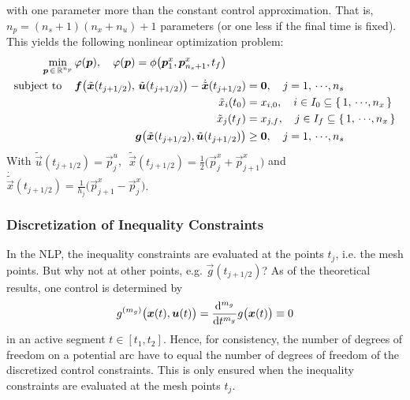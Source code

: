 				with one parameter more than the constant control approximation. That is, \( n_p = (n_s + 1) (n_x + n_u) + 1 \) parameters (or one less if the final time is fixed). This yields the following nonlinear optimization problem:
				\begin{align*}
					\min_{\bm{p} \,\in\, \mathbb{R}^{n_p}} & \, \varphi(\bm{p}),\quad \varphi(\bm{p}) = \phi\big(\bm{p}_1^x, \bm{p}_{n_s + 1}^x, t_f\big) \\
					\mathrm{subject~to}\quad        & \,
					\begin{alignedat}[t]{2}
						\bm{f}\big( \tilde{\bm{x}}(t_{j + 1/2}),\, \tilde{\bm{u}}(t_{j + 1/2}) \big) - \dot{\tilde{\bm{x}}}(t_{j + 1/2}) &= \bm{0},\quad j = 1,\,\cdots\!,n_s \\
						\tilde{x}_i(t_0) &= x_{i, 0},\quad i \in I_0 \subseteq \{\, 1,\,\cdots\!,n_x \,\} \\
						\tilde{x}_j(t_f) &= x_{j, f},\quad j \in I_f \subseteq \{\, 1,\,\cdots\!,n_x \,\} \\
						\bm{g}\big( \tilde{\bm{x}}(t_{j + 1/2}), \tilde{\bm{u}}(t_{j + 1/2}) \big) &\geq \bm{0},\quad j = 1,\,\cdots\!,n_s
					\end{alignedat}
				\end{align*}
				With \( \tilde{\vec{u}}(t_{j + 1/2}) = \vec{p}_j^u \),\,\, \( \tilde{\vec{x}}(t_{j + 1/2}) = \frac{1}{2} \big( \vec{p}_j^x + \vec{p}_{j + 1}^x \big) \) and \( \dot{\tilde{\vec{x}}}(t_{j + 1/2}) = \frac{1}{h_j} \big( \vec{p}_{j + 1}^x - \vec{p}_j^x \big) \).

			\subsubsection{Discretization of Inequality Constraints}
				In the NLP, the inequality constraints are evaluated at the points \( t_j \), i.e. the mesh points. But why not at other points, e.g. \( \vec{g}(t_{j + 1/2}) \)? As of the theoretical results, one control is determined by
				\begin{align*}
					g^{(m_g)}\big(\bm{x}(t), \bm{u}(t)\big) = \dv[m_g]{t} g\big(\bm{x}(t)\big) \equiv 0
				\end{align*}
				in an active segment \( t \in [t_1, t_2] \). Hence, for consistency, the number of degrees of freedom on a potential arc have to equal the number of degrees of freedom of the discretized control constraints. This is only ensured when the inequality constraints are evaluated at the mesh points \(t_j\).

